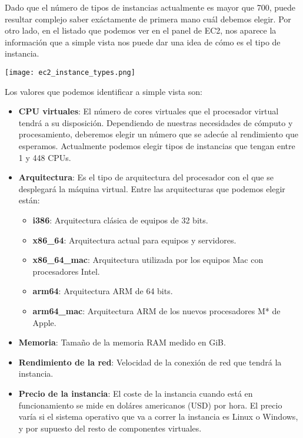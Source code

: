 Dado que el número de tipos de instancias actualmente es mayor que 700, puede resultar complejo saber exáctamente de primera mano cuál debemos elegir. Por otro lado, en el listado que podemos ver en el panel de EC2, nos aparece la información que a simple vista nos puede dar una idea de cómo es el tipo de instancia.


\begin{center}
	\texttt{[image: ec2\_instance\_types.png]}
\end{center}

Los valores que podemos identificar a simple vista son:

\begin{itemize}
	\item \textbf{CPU virtuales}: El número de cores virtuales que el procesador virtual tendrá a su disposición. Dependiendo de nuestras necesidades de cómputo y procesamiento, deberemos elegir un número que se adecúe al rendimiento que esperamos. Actualmente podemos elegir tipos de instancias que tengan entre 1 y 448 CPUs.
	
	\item \textbf{Arquitectura}: Es el tipo de arquitectura del procesador con el que se desplegará la máquina virtual. Entre las arquitecturas que podemos elegir están:
	\begin{itemize}
		\item \textbf{i386}: Arquitectura clásica de equipos de 32 bits.
		\item \textbf{x86\_64}: Arquitectura actual para equipos y servidores.
		\item \textbf{x86\_64\_mac}: Arquitectura utilizada por los equipos Mac con procesadores Intel.
		\item \textbf{arm64}: Arquitectura ARM de 64 bits.
		\item \textbf{arm64\_mac}: Arquitectura ARM de los nuevos procesadores M* de Apple.
	\end{itemize}
	
	\item \textbf{Memoria}: Tamaño de la memoria RAM medido en GiB.
	
	\item \textbf{Rendimiento de la red}: Velocidad de la conexión de red que tendrá la instancia.
	
	\item \textbf{Precio de la instancia}: El coste de la instancia cuando está en funcionamiento se mide en doláres americanos (USD) por hora. El precio varía si el sistema operativo que va a correr la instancia es Linux o Windows, y por supuesto del resto de componentes virtuales.
	
\end{itemize}


